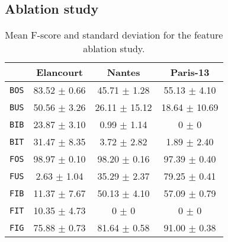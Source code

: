     \subsection{Ablation study}
        \begin{table}
            \tiny
            \begin{tabular}{c c c c}
                \toprule
                & \textbf{Elancourt} & \textbf{Nantes} & \textbf{Paris-13}\\
                \midrule
                \texttt{BOS} & 83.52 $\pm$ 0.66 & 45.71 $\pm$ 1.28 & 55.13 $\pm$ 4.10 \\
                \midrule
                \texttt{BUS} & 50.56 $\pm$ 3.26 & 26.11 $\pm$ 15.12 & 18.64 $\pm$ 10.69 \\
                \midrule
                \texttt{BIB} & 23.87 $\pm$ 3.10 & 0.99 $\pm$ 1.14 & 0 $\pm$ 0 \\
                \midrule
                \texttt{BIT} & 31.47 $\pm$ 8.35 & 3.72 $\pm$ 2.82 & 1.89 $\pm$ 2.40 \\
                \midrule
                \midrule
                \texttt{FOS} & 98.97 $\pm$ 0.10 & 98.20 $\pm$ 0.16 & 97.39 $\pm$ 0.40 \\
                \midrule
                \texttt{FUS} & 2.63 $\pm$ 1.04 & 35.29 $\pm$ 2.37 & 79.25 $\pm$ 0.41 \\
                \midrule
                \texttt{FIB} & 11.37 $\pm$ 7.67 & 50.13 $\pm$ 4.10 & 57.09 $\pm$ 0.79 \\
                \midrule
                \texttt{FIT} & 10.35 $\pm$ 4.73 & 0 $\pm$ 0 & 0 $\pm$ 0 \\
                \midrule
                \texttt{FIG} & 75.88 $\pm$ 0.73 & 81.64 $\pm$ 0.58 & 91.00 $\pm$ 0.38 \\
                \bottomrule
            \end{tabular}
            \caption{\label{tab::f_score_ablation_f3} Mean F-score and standard deviation for the feature ablation study.}
        \end{table}